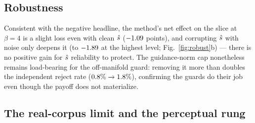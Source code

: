 \subsection{Robustness}
\label{sec:robust}
Consistent with the negative headline, the method's net effect on the slice at
$\beta{=}4$ is a slight loss even with clean $\hat s$ ($-1.09$ points),
and corrupting $\hat s$ with noise only deepens it (to $-1.89$ at the
highest level; Fig.~\ref{fig:robust}b) --- there is no positive gain for $\hat s$
reliability to protect. The guidance-norm cap nonetheless remains load-bearing
for the off-manifold guard: removing it more than doubles the independent reject
rate ($0.8\%\to1.8\%$), confirming the guards do their job even
though the payoff does not materialize.

\subsection{The real-corpus limit and the perceptual rung}
\label{sec:real}

